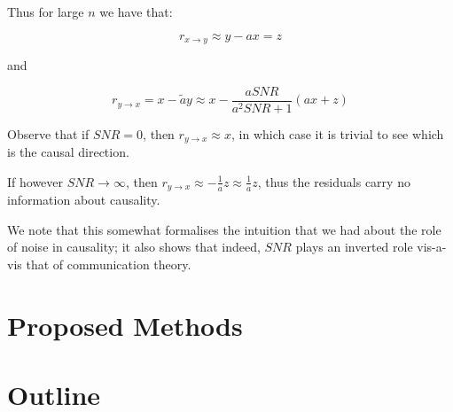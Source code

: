 Thus for large $n$ we have that:

$$
    r_{x \rightarrow y} \approx y - ax = z
$$

and

$$
    r_{y \rightarrow x} = x - \tilde{a}y \approx x - \frac{a SNR}{a^2 SNR + 1} (ax + z) 
$$

Observe that if $SNR = 0$, then $r_{y \rightarrow x} \approx x$, in which case it is trivial
to see which is the causal direction. 

If however $SNR \rightarrow \infty$, then $r_{y \rightarrow x} \approx -\frac{1}{a}z \approx \frac{1}{a}z$, thus 
the residuals carry no information about causality.

We note that this somewhat formalises the intuition that we had about the role of noise in 
causality; it also shows that indeed, $SNR$ plays an inverted role vis-a-vis that of communication
theory. 

\section{Proposed Methods}
\section{Outline}